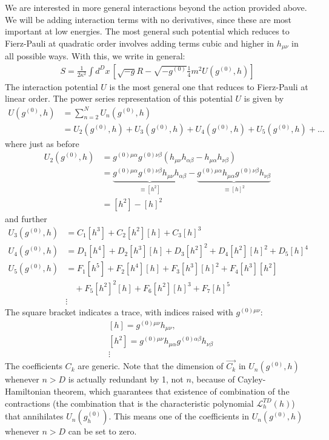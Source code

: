 \documentclass{book}
\theoremstyle{definition}
\newcommand{\lag}{\mathcal{L}}
\newcommand{\nn}{\nonumber}
\newcommand{\al}{\alpha}
\newcommand{\be}{\beta}
\newcommand{\f}[2]{\frac{#1}{#2}}
\newcommand{\lp}{\left(}
\newcommand{\rp}{\right)}
\newcommand{\lb}{\left[}
\newcommand{\rb}{\right]}
\begin{document}
We are interested in more general interactions beyond the action provided above. We will be adding interaction terms with no derivatives, since these are most important at low energies. The most general such potential which reduces to Fierz-Pauli at quadratic order involves adding terms cubic and higher in $h_{\mu\nu}$ in all possible ways. With this, we write in general:
\begin{align}\label{general-massive}
\boxed{S = \f{1}{2\kappa^2}\int d^Dx\, \lb \sqrt{-g}R - \sqrt{-g^{(0)}}\f{1}{4}m^2 U(g^{(0)},h) \rb}
\end{align}
The interaction potential $U$ is the most general one that reduces to Fierz-Pauli at linear order. The power series representation of this potential $U$ is given by
\begin{align}
U(g^{(0)},h) &= \sum^N_{n=2}U_n(g^{(0)},h) \nn\\
&= U_2(g^{(0)},h) + U_3(g^{(0)},h) + U_4(g^{(0)},h) + U_5(g^{(0)},h) + \dots
\end{align}
where just as before
\begin{align}
U_2(g^{(0)},h) &= g^{(0)\mu\alpha}g^{(0)\nu\beta}\lp h_{\mu\nu}h_{\alpha\beta} - h_{\mu\alpha}h_{\nu\beta} \rp   \nn\\
&= \underbrace{g^{(0)\mu\alpha}g^{(0)\nu\beta}h_{\mu\nu}h_{\alpha\beta}}_{\equiv [h^2]} - \underbrace{g^{(0)\mu\alpha}h_{\mu\alpha}g^{(0)\nu\beta}h_{\nu\beta}}_{\equiv [h]^2}\nn\\
&= [h^2] - [h]^2
\end{align}
and further
\begin{align}
U_3(g^{(0)},h) &= C_1[h^3] + C_2[h^2][h] + C_3[h]^3\nn\\
U_4(g^{(0)},h) &= D_1[h^4] + D_2[h^3][h] + D_3[h^2]^2 + D_4[h^2][h]^2 + D_5[h]^4\nn\\
U_5(g^{(0)},h) &= F_1[h^5] + F_2[h^4][h] + F_3[h^3][h]^2 + F_4[h^3][h^2]\nn\\ &\,\,\,\,\,\,+ F_5[h^2]^2[h] + F_6[h^2][h]^3 + F_7[h]^5\nn\\
&\vdots
\end{align}
The square bracket indicates a trace, with indices raised with $g^{(0)\mu\nu}$:
\begin{align}
&[h] = g^{(0)\mu\nu}h_{\mu\nu},\nn\\
&[h^2] = g^{(0)\mu\nu}h_{\mu\al}g^{(0)\al\be}h_{\nu\beta} \nn\\
&\vdots
\end{align}
The coefficients $C_k$ are generic. Note that the dimension of $\vec{C_k}$ in $U_n(g^{(0)},h)$ whenever $n>D$ is actually redundant by 1, not $n$, because of Cayley-Hamiltonian theorem, which guarantees that existence of combination of the contractions (the combination that is the characteristic polynomial $\lag_h^{TD}(h)$) that annihilates $U_n(g^{(0)}_h)$. This means one of the coefficients in $U_n(g^{(0)},h)$ whenever $n>D$ can be set to zero. \\
\end{document}
